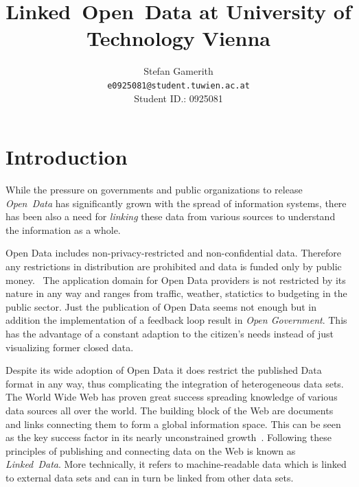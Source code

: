 \documentclass{article}
\begin{document}
\renewcommand{\bibname}{References}

\pagestyle{plain}
\setlength{\tabcolsep}{10pt}

\title{Linked~Open~Data at University of Technology Vienna}

\author{Stefan Gamerith\\
\texttt{e0925081@student.tuwien.ac.at} \\ Student ID.: 0925081}

\maketitle

\begin{abstract}
\end{abstract}

\tableofcontents

\newpage
{}

\section{Introduction}
While the pressure on governments and public organizations to release \textit{Open~Data} has significantly grown with the spread of information systems, there has been also a need for \textit{linking} these data from various sources to understand the information as a whole.

Open Data includes non-privacy-restricted and non-confidential data. Therefore any restrictions in distribution are prohibited and data is funded only by public money.~\citet{article:janssen2012benefits} The application domain for Open Data providers is not restricted by its nature in any way and ranges from traffic, weather, statictics to budgeting in the public sector. Just the publication of Open Data seems not enough but in addition the implementation of a feedback loop result in \textit{Open Government}. This has the advantage of a constant adaption to the citizen's needs instead of just visualizing former closed data. 

Despite its wide adoption of Open Data it does restrict the published Data format in any way, thus complicating the integration of heterogeneous data sets. The World Wide Web has proven great success spreading knowledge of various data sources all over the world. The building block of the Web are documents and links connecting them to form a global information space. This can be seen as the key success factor in its nearly unconstrained growth~\cite{report:jacobs-i-2004--a}. 
Following these principles of publishing and connecting data on the Web is known as \textit{Linked~Data}. More technically, it refers to machine-readable data which is linked to external data sets and can in turn be linked from other data sets. 
\end{document}
